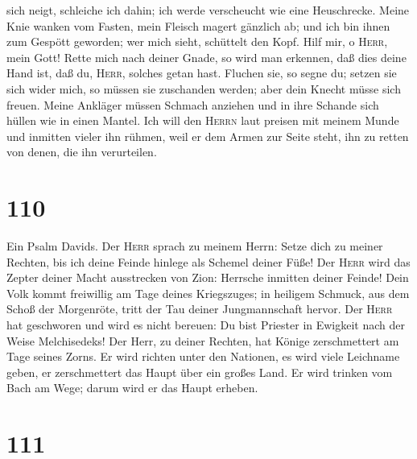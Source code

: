sich neigt, schleiche ich dahin; ich werde verscheucht wie eine
Heuschrecke.  Meine Knie wanken vom Fasten, mein Fleisch
magert gänzlich ab;  und ich bin ihnen zum Gespött
geworden; wer mich sieht, schüttelt den Kopf.  Hilf mir,
o \textsc{Herr}, mein Gott! Rette mich nach deiner Gnade,
 so wird man erkennen, daß dies deine Hand ist, daß du,
\textsc{Herr}, solches getan hast.  Fluchen sie, so segne
du; setzen sie sich wider mich, so müssen sie zuschanden werden; aber
dein Knecht müsse sich freuen.  Meine Ankläger müssen
Schmach anziehen und in ihre Schande sich hüllen wie in einen Mantel.
 Ich will den \textsc{Herrn} laut preisen mit meinem
Munde und inmitten vieler ihn rühmen,  weil er dem Armen
zur Seite steht, ihn zu retten von denen, die ihn verurteilen.

\hypertarget{section-109}{%
\section{110}\label{section-109}}

 Ein Psalm Davids. Der \textsc{Herr} sprach zu meinem
Herrn: Setze dich zu meiner Rechten, bis ich deine Feinde hinlege als
Schemel deiner Füße!  Der \textsc{Herr} wird das Zepter
deiner Macht ausstrecken von Zion: Herrsche inmitten deiner Feinde!
 Dein Volk kommt freiwillig am Tage deines Kriegszuges; in
heiligem Schmuck, aus dem Schoß der Morgenröte, tritt der Tau deiner
Jungmannschaft hervor.  Der \textsc{Herr} hat geschworen
und wird es nicht bereuen: Du bist Priester in Ewigkeit nach der Weise
Melchisedeks!  Der Herr, zu deiner Rechten, hat Könige
zerschmettert am Tage seines Zorns.  Er wird richten unter
den Nationen, es wird viele Leichname geben, er zerschmettert das Haupt
über ein großes Land.  Er wird trinken vom Bach am Wege;
darum wird er das Haupt erheben.

\hypertarget{section-110}{%
\section{111}\label{section-110}}

